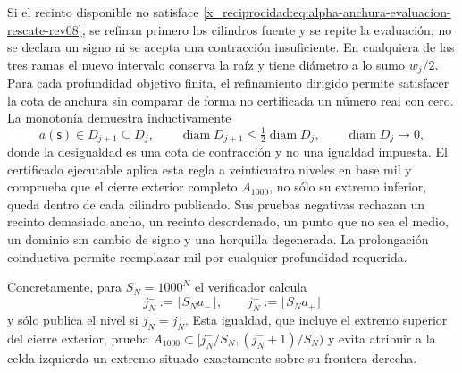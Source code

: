 Si el recinto disponible no satisface
\eqref{x_reciprocidad:eq:alpha-anchura-evaluacion-rescate-rev08}, se refinan primero los
cilindros fuente y se repite la evaluación; no se declara un signo ni se
acepta una contracción insuficiente. En cualquiera de las tres ramas el nuevo
intervalo conserva la raíz y tiene diámetro a lo sumo \(w_j/2\). Para cada
profundidad objetivo finita, el refinamiento dirigido permite satisfacer la
cota de anchura sin comparar de forma no certificada un número real con cero.
La monotonía demuestra inductivamente
\begin{equation}
 a(\mathsf s)\in D_{j+1}\subseteq D_j,\qquad
 \operatorname{diam}D_{j+1}\leq
 \tfrac12\operatorname{diam}D_j,
 \qquad \operatorname{diam}D_j\longrightarrow0,
 \label{x_reciprocidad:eq:alpha-biseccion-racional}
\end{equation}
donde la desigualdad es una cota de contracción y no una igualdad impuesta.
El certificado ejecutable aplica
esta regla a veinticuatro niveles en base mil y comprueba que el cierre
exterior completo \(A_{1000}\), no sólo su extremo inferior, queda dentro de
cada cilindro publicado. Sus pruebas negativas rechazan un recinto demasiado
ancho, un recinto desordenado, un punto que no sea el medio, un dominio sin
cambio de signo y una horquilla degenerada. La prolongación coinductiva permite
reemplazar mil por cualquier profundidad requerida.

Concretamente, para \(S_N=1000^N\) el verificador calcula
\begin{equation}
 j_N^-:=\lfloor S_Na_-\rfloor,
 \qquad j_N^+:=\lfloor S_Na_+\rfloor
 \label{x_reciprocidad:eq:alpha-indices-cilindro-dirigidos-rev08}
\end{equation}
y sólo publica el nivel si \(j_N^-=j_N^+\). Esta igualdad, que incluye el
extremo superior del cierre exterior, prueba
\(A_{1000}\subset[j_N^-/S_N,(j_N^-+1)/S_N)\) y evita atribuir a la celda
izquierda un extremo situado exactamente sobre su frontera derecha.

